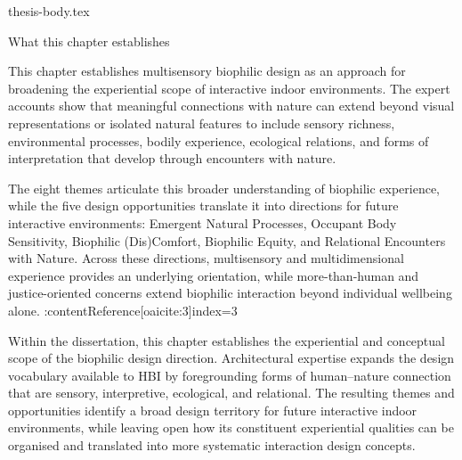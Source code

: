 {thesis-body.tex}
\FloatBarrier
\clearpage

\begin{chapterclosing}{What this chapter establishes}

This chapter establishes multisensory biophilic design as an approach for broadening the experiential scope of interactive indoor environments. The expert accounts show that meaningful connections with nature can extend beyond visual representations or isolated natural features to include sensory richness, environmental processes, bodily experience, ecological relations, and forms of interpretation that develop through encounters with nature.

The eight themes articulate this broader understanding of biophilic experience, while the five design opportunities translate it into directions for future interactive environments: Emergent Natural Processes, Occupant Body Sensitivity, Biophilic (Dis)Comfort, Biophilic Equity, and Relational Encounters with Nature. Across these directions, multisensory and multidimensional experience provides an underlying orientation, while more-than-human and justice-oriented concerns extend biophilic interaction beyond individual wellbeing alone. :contentReference[oaicite:3]{index=3}

Within the dissertation, this chapter establishes the experiential and conceptual scope of the biophilic design direction. Architectural expertise expands the design vocabulary available to HBI by foregrounding forms of human--nature connection that are sensory, interpretive, ecological, and relational. The resulting themes and opportunities identify a broad design territory for future interactive indoor environments, while leaving open how its constituent experiential qualities can be organised and translated into more systematic interaction design concepts.

\end{chapterclosing}